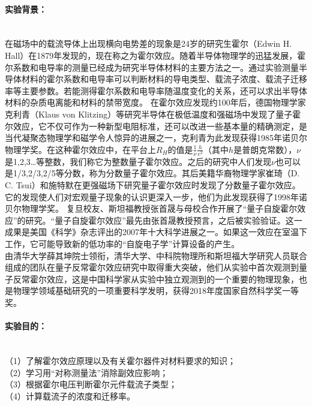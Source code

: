 \documentclass[UTF8]{ctexart}
\begin{document}
\title{}
\maketitle
{}
\paragraph*{实验背景：}~\\
\indent 在磁场中的载流导体上出现横向电势差的现象是24岁的研究生霍尔（Edwin H. Hall）在1879年发现的，现在称之为霍尔效应。随着半导体物理学的迅猛发展，霍尔系数和电导率的测量已经成为研究半导体材料的主要方法之一。通过实验测量半导体材料的霍尔系数和电导率可以判断材料的导电类型、载流子浓度、载流子迁移率等主要参数。若能测得霍尔系数和电导率随温度变化的关系，还可以求出半导体材料的杂质电离能和材料的禁带宽度。
在霍尔效应发现约100年后，德国物理学家克利青（Klaus von Klitzing）等研究半导体在极低温度和强磁场中发现了量子霍尔效应，它不仅可作为一种新型电阻标准，还可以改进一些基本量的精确测定，是当代凝聚态物理学和磁学令人惊异的进展之一，克利青为此发现获得1985年诺贝尔物理学奖。在这种霍尔效应中，在平台上$R_{H}$的值是$\frac{1}{\nu}$$\frac{h}{e^2}$（其中$h$是普朗克常数），$\nu$是1,2,3…等整数，我们称它为整数量子霍尔效应。之后的研究中人们发现$\nu$也可以是1/3,2/3,2/5等分数，称为分数量子霍尔效应。其后美籍华裔物理学家崔琦（D. C. Tsui）和施特默在更强磁场下研究量子霍尔效应时发现了分数量子霍尔效应。它的发现使人们对宏观量子现象的认识更深入一步，他们为此发现获得了1998年诺贝尔物理学奖。
复旦校友、斯坦福教授张首晟与母校合作开展了“量子自旋霍尔效应”的研究。“量子自旋霍尔效应”最先由张首晟教授预言，之后被实验验证。这一成果是美国《科学》杂志评出的2007年十大科学进展之一。如果这一效应在室温下工作，它可能导致新的低功率的“自旋电子学”计算设备的产生。\\
\indent 由清华大学薛其坤院士领衔，清华大学、中科院物理所和斯坦福大学研究人员联合组成的团队在量子反常霍尔效应研究中取得重大突破，他们从实验中首次观测到量子反常霍尔效应，这是中国科学家从实验中独立观测到的一个重要的物理现象，也是物理学领域基础研究的一项重要科学发明，获得2018年度国家自然科学奖一等奖。
\paragraph*{实验目的：}~\\
（1）了解霍尔效应原理以及有关霍尔器件对材料要求的知识；~\\
（2）学习用“对称测量法”消除副效应影响；~\\
（3）根据霍尔电压判断霍尔元件载流子类型；~\\
（4）计算载流子的浓度和迁移率。
\end{document}
